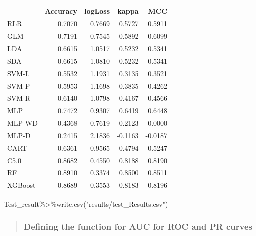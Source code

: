 \documentclass[
]{article}
\newenvironment{Shaded}{\begin{snugshade}}{\end{snugshade}}
\newcommand{\FunctionTok}[1]{\textcolor[rgb]{0.00,0.00,0.00}{#1}}
\newcommand{\NormalTok}[1]{#1}
\newcommand{\SpecialCharTok}[1]{\textcolor[rgb]{0.00,0.00,0.00}{#1}}
\newcommand{\StringTok}[1]{\textcolor[rgb]{0.31,0.60,0.02}{#1}}
\begin{document}
\begin{longtable}[]{@{}lrrrr@{}}
\toprule()
& Accuracy & logLoss & kappa & MCC \\
\midrule()
\endhead
RLR & 0.7070 & 0.7669 & 0.5727 & 0.5911 \\
GLM & 0.7191 & 0.7545 & 0.5892 & 0.6099 \\
LDA & 0.6615 & 1.0517 & 0.5232 & 0.5341 \\
SDA & 0.6615 & 1.0810 & 0.5232 & 0.5341 \\
SVM-L & 0.5532 & 1.1931 & 0.3135 & 0.3521 \\
SVM-P & 0.5953 & 1.1698 & 0.3835 & 0.4262 \\
SVM-R & 0.6140 & 1.0798 & 0.4167 & 0.4566 \\
MLP & 0.7472 & 0.9307 & 0.6419 & 0.6448 \\
MLP-WD & 0.4368 & 0.7619 & -0.2123 & 0.0000 \\
MLP-D & 0.2415 & 2.1836 & -0.1163 & -0.0187 \\
CART & 0.6361 & 0.9565 & 0.4794 & 0.5247 \\
C5.0 & 0.8682 & 0.4550 & 0.8188 & 0.8190 \\
RF & 0.8910 & 0.3374 & 0.8500 & 0.8511 \\
XGBoost & 0.8689 & 0.3553 & 0.8183 & 0.8196 \\
\bottomrule()
\end{longtable}

\begin{Shaded}
\begin{Highlighting}[]
\NormalTok{Test\_result}\SpecialCharTok{\%\textgreater{}\%}\FunctionTok{write.csv}\NormalTok{(}\StringTok{"results/test\_Results.csv"}\NormalTok{)}
\end{Highlighting}
\end{Shaded}

\begin{quote}
\hypertarget{defining-the-function-for-auc-for-roc-and-pr-curves}{%
\subsubsection{Defining the function for AUC for ROC and PR
curves}\label{defining-the-function-for-auc-for-roc-and-pr-curves}}
\end{quote}
\end{document}
